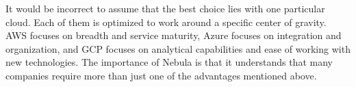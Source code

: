 It would be incorrect to assume that the best choice lies with one particular cloud. Each of them is optimized to work around a specific center of gravity. AWS focuses on breadth and service maturity, Azure focuses on integration and organization, and GCP focuses on analytical capabilities and ease of working with new technologies. The importance of Nebula is that it understands that many companies require more than just one of the advantages mentioned above.

\newpage
